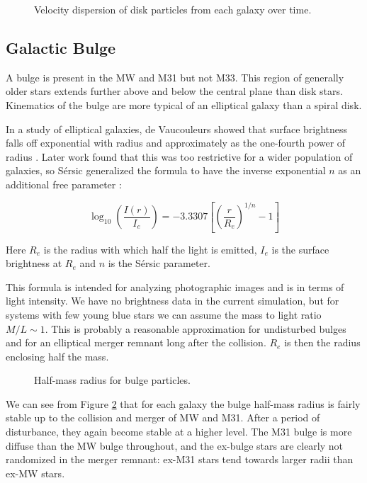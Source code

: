 \documentclass[twocolumn]{aastex63}
\begin{document}
\begin{figure}[htb!]
	\caption{Velocity dispersion of disk particles from each galaxy over time.
		\label{fig:vel_disp}}
\end{figure}

\subsection{Galactic Bulge}

A bulge is present in the MW and M31 but not M33. This region of generally older stars extends further above and below the central plane than disk stars. Kinematics of the bulge are more typical of an elliptical galaxy than a spiral disk.

In a study of elliptical galaxies, de Vaucouleurs showed that surface brightness falls off exponential with radius and approximately as the one-fourth power of radius \citep{de_vaucouleurs_recherches_1948}. Later work found that this was too restrictive for a wider population of galaxies, so Sérsic generalized the formula to have the inverse exponential $n$ as an additional free parameter \citep{sersic_influence_1963}:

\[ \log_{10} \left( \frac{I(r)}{I_e} \right) =  -3.3307 \left[ \left( \frac{r}{R_e} \right)^{1/n} - 1 \right] \]

Here $R_e$ is the radius with which half the light is emitted,  $I_e$ is the surface brightness at $R_e$ and $n$ is the Sérsic parameter.

This formula is intended for analyzing photographic images and is in terms of light intensity. We have no brightness data in the current simulation, but for systems with few young blue stars we can assume the mass to light ratio $M/L \sim 1$. This is probably a reasonable approximation for undisturbed bulges and for an elliptical merger remnant long after the collision. $R_e$ is then the radius enclosing half the mass.

\begin{figure}[bht!]
	\caption{Half-mass radius for bulge particles.
		\label{fig:sersic_Re}}
\end{figure}

We can see from Figure \ref{fig:sersic_Re} that for each galaxy the bulge half-mass radius is fairly stable up to the collision and merger of MW and M31. After a period of disturbance, they again become stable at a higher level. The M31 bulge is more diffuse than the MW bulge throughout, and the ex-bulge stars are clearly not randomized in the merger remnant: ex-M31 stars tend towards larger radii than ex-MW stars.
\end{document}
